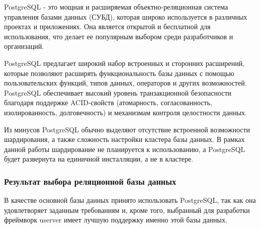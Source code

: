 PostgreSQL - это мощная и расширяемая объектно-реляционная система управления базами данных (СУБД), которая широко используется в различных проектах и приложениях. Она является открытой и бесплатной для использования, что делает ее популярным выбором среди разработчиков и организаций. 

PostgreSQL предлагает широкий набор встроенных и сторонних расширений, которые позволяют расширять функциональность базы данных с помощью пользовательских функций, типов данных, операторов и других возможностей. PostgreSQL обеспечивает высокий уровень транзакционной безопасности благодаря поддержке ACID-свойств (атомарность, согласованность, изолированность, долговечность) и механизмам контроля целостности данных.

Из минусов PostgreSQL обычно выделяют отсутствие встроенной возможности шардирования, а также сложность настройки кластера базы данных. В рамках данной работы шардирование не планируется к использованию, а PostgreSQL будет развернута на единичной инсталляции, а не в кластере.

\subsubsection{Результат выбора реляционной базы данных}

В качестве основной базы данных принято использовать PostgreSQL, так как она удовлетворяет заданным требованиям и, кроме того, выбранный для разработки фреймворк userver имеет лучшую поддержку именно этой базы данных.


